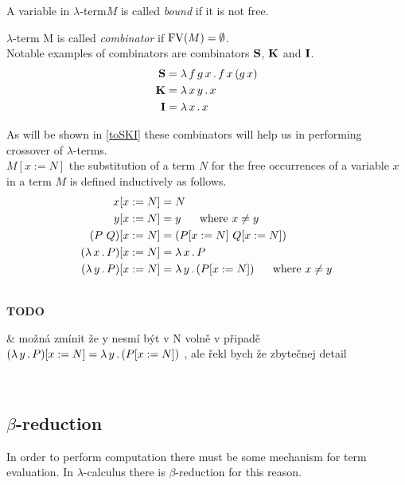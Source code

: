 \documentclass[12pt,a4paper]{report}
\newcommand{\lterm}{$\lambda$-term\xspace}
\newcommand{\lterms}{$\lambda$-terms\xspace}
\newenvironment{todo}
{ ~\\[0.5em]
  {\color{red}\textbf{TODO}}
  \begin{easylist}[itemize]}
{ \end{easylist}
  ~}
\begin{document}
A variable in \lterm $M$ is called \textit{bound} if it is not free.

\lterm M is called \textit{combinator} if $\mathop{\mathrm{FV}}(M)=\emptyset$.\\


Notable examples of combinators are combinators
$\mathbf{S}$, $\mathbf{K}$ and $\mathbf{I}$.
\begin{align*}
\mathbf{S} &= \lambda \, f\,g\,x \, . \, f\,x\,(g\,x) \\
\mathbf{K} &= \lambda \, x\,y \, . \, x \\
\mathbf{I} &= \lambda \, x \, . \, x 
\end{align*}

As will be shown in \ref{toSKI}
these combinators will help us in performing crossover of \lterms.\\

$M[x:=N]$ the substitution of a term $N$ for the free occurrences of 
a variable $x$ in a term $M$ is defined inductively as follows.
\begin{align*}
x[x:=N]           &= N \\
y[x:=N]           &= y \text{ ~~~~where } x \not= y  \\
(P~Q)[x:=N]       &= ( P[x:=N]  ~ Q[x:=N] ) \\
( \lambda \, x \, . \, P )[x:=N] &= \lambda \, x \, . \, P\\
( \lambda \, y \, . \, P )[x:=N] &= \lambda \, y \, . \, ( P[x:=N] ) \text{ ~~~~where } x \not= y
\end{align*}




\begin{todo}
& možná zmínit že y nesmí být v N volně v připadě\\
  $( \lambda \, y \, . \, P )[x:=N] = \lambda \, y \, . \, ( P[x:=N] )$ , 
  ale řekl bych že zbytečnej detail
\end{todo}


\subsection{$\beta$-reduction}

In order to perform computation there must be some
mechanism for term evaluation. In $\lambda$-calculus there
is $\beta$-reduction for this reason.\\

\newcommand{\bRedex}{$\beta$-redex\xspace}
\newcommand{\bRedexes}{$\beta$-redexes\xspace}
\newcommand{\bArrow}{\rightarrow_\beta\xspace}
\newcommand{\eArrow}{\rightarrow_\eta\xspace}
\newcommand{\eeArrow}{\rightarrow_{\eta^{-1}}\xspace}
\end{document}
